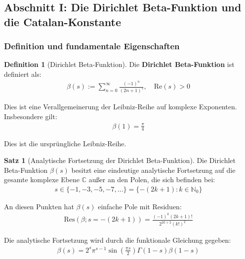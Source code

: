 \documentclass[a4paper,12pt,twoside]{report}
\theoremstyle{definition}
\newtheorem{definition}{Definition}
\newtheorem{satz}{Satz}
\begin{document}
\subsection{Abschnitt I: Die Dirichlet Beta-Funktion und die Catalan-Konstante}

\subsubsection{Definition und fundamentale Eigenschaften}

\begin{definition}[Dirichlet Beta-Funktion]
Die \textbf{Dirichlet Beta-Funktion} ist definiert als:
\begin{align}
	\beta(s) := \sum_{n=0}^{\infty} \frac{(-1)^n}{(2n+1)^s}, \quad \text{Re}(s) > 0
	\label{eq:dirichlet_beta_def}
\end{align}

Dies ist eine Verallgemeinerung der Leibniz-Reihe auf komplexe Exponenten. Insbesondere gilt:
\begin{align}
	\beta(1) = \frac{\pi}{4}
\end{align}

Dies ist die ursprüngliche Leibniz-Reihe.
\end{definition}

\begin{satz}[Analytische Fortsetzung der Dirichlet Beta-Funktion]
Die Dirichlet Beta-Funktion $\beta(s)$ besitzt eine eindeutige analytische Fortsetzung auf die gesamte komplexe Ebene $\mathbb{C}$ außer an den Polen, die sich befinden bei:
\begin{align}
	s \in \{-1, -3, -5, -7, \ldots\} = \{-(2k+1) : k \in \mathbb{N}_0\}
\end{align}

An diesen Punkten hat $\beta(s)$ einfache Pole mit Residuen:
\begin{align}
	\text{Res}(\beta; s = -(2k+1)) = \frac{(-1)^k (2k+1)!}{2^{2k+2} (k!)^2}
	\label{eq:beta_residues}
\end{align}

Die analytische Fortsetzung wird durch die funktionale Gleichung gegeben:
\begin{align}
	\beta(s) = 2^s \pi^{s-1} \sin\left(\frac{\pi s}{2}\right) \Gamma(1-s) \beta(1-s)
	\label{eq:beta_functional}
\end{align}
\end{satz}
\end{document}
